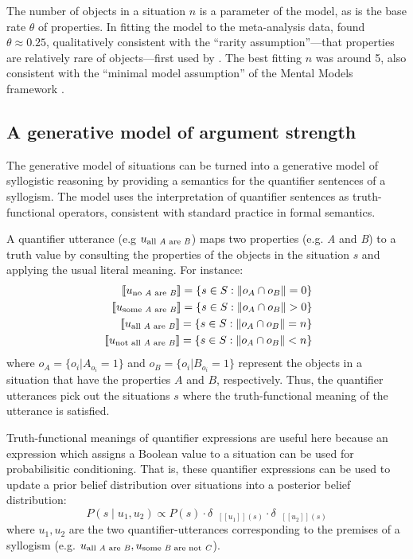 \documentclass[floatsintext, doc]{apa6}
\newcommand{\denote}[1]{\mbox{ $[\![ #1 ]\!]$}}
\begin{document}
The number of objects in a situation $n$ is a parameter of the model, as is the base rate $\theta$ of properties. In fitting the model to the meta-analysis data,  found $\theta \approx 0.25$, qualitatively consistent with the ``rarity assumption''---that properties are relatively rare of objects---first used by . The best fitting $n$ was around 5, also consistent with the ``minimal model assumption'' of the Mental Models framework \cite{JL1983}.


\subsection{A generative model of argument strength}

The generative model of situations can be turned into a generative model of syllogistic reasoning by providing a semantics for the quantifier sentences of a syllogism. The model uses the interpretation of quantifier sentences as truth-functional operators, consistent with standard practice in formal semantics. 

A quantifier utterance (e.g $u_{\textrm{all \emph{A} are \emph{B}}}$) maps two properties (e.g. \emph{A} and \emph{B}) to a truth value by consulting the properties of the objects in the situation $s$ and applying the usual literal meaning. For instance:
\begin{align*}
\denote{u_{\textrm{no  \emph{A} are \emph{B}}}}= \{s \in S : \| o_A \cap o_B \| = 0\}\\ 
\denote{u_{\textrm{some  \emph{A} are \emph{B}}}}= \{s \in S: \| o_A \cap o_B \|> 0\}\\
\denote{u_{\textrm{all  \emph{A} are \emph{B}}}}= \{s \in S: \| o_A \cap o_B \| = n\}\\
\denote{u_{\textrm{not all  \emph{A} are \emph{B}}}}= \{s \in S: \| o_A \cap o_B \|< n\}
\end{align*}
%
where $o_A = \{o_i | A_{o_{i}} = 1\} $ and $o_B = \{o_i | B_{o_{i}} = 1\} $ represent the objects in a situation that have the properties $A$ and $B$, respectively.
Thus, the quantifier utterances pick out the situations $s$ where the truth-functional meaning of the utterance is satisfied. 
 
Truth-functional meanings of quantifier expressions are useful here because an expression which assigns a Boolean value to a situation can be used for probabilisitic conditioning. That is, these quantifier expressions can be used to update a prior belief distribution over situations into a posterior belief distribution: 
$$P(s \mid u_1, u_2) \propto P(s)\cdot \delta_{\denote{u_1}(s)} \cdot \delta_{\denote{u_2}(s)} $$
where $u_1, u_2$ are the two quantifier-utterances corresponding to the premises of a syllogism (e.g. $u_{\textrm{all  \emph{A} are \emph{B}}}, u_{\textrm{some  \emph{B} are not \emph{C}}}$).
\end{document}
